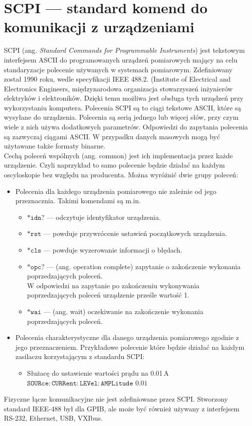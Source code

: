 \section{SCPI --- standard komend do komunikacji z urządzeniami}
SCPI  (ang. \textit{Standard  Commands  for  Programmable  Instruments}) jest tekstowym interfejsem ASCII do programowanych urządzeń pomiarowych mający na celu standaryzacje polecenie używanych w systemach pomiarowym. Zdefiniowany został 1990 roku, wedle specyfikacji IEEE 488.2. (Institute of Electrical and Electronics Engineers, międzynarodowa organizacja stowarzyszeń inżynierów elektryków i elektroników.  Dzięki temu możliwa jest obsługa tych urządzeń przy wykorzystaniu komputera. Polecenia SCPI są to ciągi tekstowe ASCII, które są wysyłane do urządzenia. Polecenia są serią jednego lub więcej słów, przy czym wiele z nich używa dodatkowych parametrów. Odpowiedzi do zapytania polecenia są zazwyczaj ciągami ASCII. W przypadku danych masowych mogą być użytawane także formaty binarne. \\

Cechą  poleceń  wspólnych  (ang.  common)  jest  ich  implementacja  przez  każde urządzenie. Czyli naprzykład to samo polecenie będzie działać na każdym oscyloskopie bez względu na producenta. Można wyróżnić dwie grupy poleceń:
\begin{itemize}
\item Polecenia dla każdego urządzenia pomiarowego nie zależnie od jego przeznacznia. Takimi komendami są m.in.
\begin{itemize}
\item $\mathtt{*idn?}$ --- odczytuje identyfikator urządzenia.
\item $\mathtt{*rst}$ --- powduje przywrócenie ustawień początkowych urządzenia.
\item $\mathtt{*cls}$ --- powduje wyzerowanie informacji o błędach.
\item $\mathtt{*opc?}$  --- (ang.  operation  complete)  zapytanie  o  zakończenie  wykonania
poprzedzających poleceń. \\
W  odpowiedzi  na  zapytanie  po  zakończeniu  wykonywania  poprzedzających poleceń urządzenie prześle wartość 1.
\item $\mathtt{*wai}$ ---  (ang.  wait)  oczekiwanie  na  zakończenie  wykonania  poprzedzających poleceń.
\end{itemize}

\item Polecenia charakterystyczne dla danego urządzenia pomiarowego zgodnie z jego przeznaczeniem. Przykładowe polecenie które będzie działać na każdym zasilaczu korzystającym z standardu SCPI:
\begin{itemize}
\item Służacę do ustawienie wartości prądu na 0.01\,A \\ $\mathtt{SOURce:CURRent:LEVel:AMPLitude}$  $\mathtt{0.01}$
\end{itemize}
\end{itemize}

Fizyczne łącze komunikacyjne nie jest zdefiniowane przez SCPI. Stworzony standard IEEE-488 był dla GPIB, ale może być również używany z interfejsem RS-232, Ethernet, USB, VXIbus.
\newpage